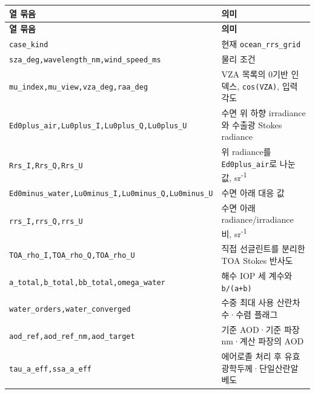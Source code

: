 {\TableFont
\begin{longtable}{@{}>{\raggedright\arraybackslash}p{}>{\raggedright\arraybackslash}p{}@{}}
\toprule
\textbf{열 묶음} & \textbf{의미} \\
\midrule
\endfirsthead
\toprule
\textbf{열 묶음} & \textbf{의미} \\
\midrule
\endhead
\bottomrule
\endfoot
\texttt{case\_\allowbreak{}kind} & 현재 \texttt{ocean\_\allowbreak{}rrs\_\allowbreak{}grid} \\
\texttt{sza\_\allowbreak{}deg,\allowbreak{}wavelength\_\allowbreak{}nm,\allowbreak{}wind\_\allowbreak{}speed\_\allowbreak{}ms} & 물리 조건 \\
\texttt{mu\_\allowbreak{}index,\allowbreak{}mu\_\allowbreak{}view,\allowbreak{}vza\_\allowbreak{}deg,\allowbreak{}raa\_\allowbreak{}deg} & VZA 목록의 0기반 인덱스, \texttt{cos(VZA)}, 입력 각도 \\
\texttt{Ed0plus\_\allowbreak{}air,\allowbreak{}Lu0plus\_\allowbreak{}I,\allowbreak{}Lu0plus\_\allowbreak{}Q,\allowbreak{}Lu0plus\_\allowbreak{}U} & 수면 위 하향 irradiance와 수출광 Stokes radiance \\
\texttt{Rrs\_\allowbreak{}I,\allowbreak{}Rrs\_\allowbreak{}Q,\allowbreak{}Rrs\_\allowbreak{}U} & 위 radiance를 \texttt{Ed0plus\_\allowbreak{}air}로 나눈 값, sr\textsuperscript{-}\textsuperscript{1} \\
\texttt{Ed0minus\_\allowbreak{}water,\allowbreak{}Lu0minus\_\allowbreak{}I,\allowbreak{}Lu0minus\_\allowbreak{}Q,\allowbreak{}Lu0minus\_\allowbreak{}U} & 수면 아래 대응 값 \\
\texttt{rrs\_\allowbreak{}I,\allowbreak{}rrs\_\allowbreak{}Q,\allowbreak{}rrs\_\allowbreak{}U} & 수면 아래 radiance/irradiance 비, sr\textsuperscript{-}\textsuperscript{1} \\
\texttt{TOA\_\allowbreak{}rho\_\allowbreak{}I,\allowbreak{}TOA\_\allowbreak{}rho\_\allowbreak{}Q,\allowbreak{}TOA\_\allowbreak{}rho\_\allowbreak{}U} & 직접 선글린트를 분리한 TOA Stokes 반사도 \\
\texttt{a\_\allowbreak{}total,\allowbreak{}b\_\allowbreak{}total,\allowbreak{}bb\_\allowbreak{}total,\allowbreak{}omega\_\allowbreak{}water} & 해수 IOP 세 계수와 \texttt{b/\allowbreak{}(a+b)} \\
\texttt{water\_\allowbreak{}orders,\allowbreak{}water\_\allowbreak{}converged} & 수중 최대 사용 산란차수·수렴 플래그 \\
\texttt{aod\_\allowbreak{}ref,\allowbreak{}aod\_\allowbreak{}ref\_\allowbreak{}nm,\allowbreak{}aod\_\allowbreak{}target} & 기준 AOD·기준 파장 nm·계산 파장의 AOD \\
\texttt{tau\_\allowbreak{}a\_\allowbreak{}eff,\allowbreak{}ssa\_\allowbreak{}a\_\allowbreak{}eff} & 에어로졸 처리 후 유효 광학두께·단일산란알베도 \\
\end{longtable}
}

